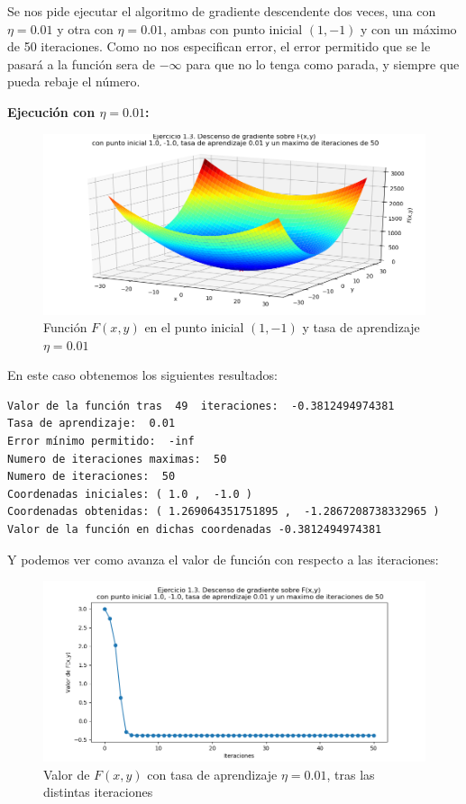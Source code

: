 \documentclass[12pt, spanish]{article}
\begin{document}
Se nos pide ejecutar el algoritmo de gradiente descendente dos veces, una con $\eta = 0.01 $ y otra con $\eta = 0.01 $, ambas con punto inicial $(1, -1)$ y con un máximo de 50 iteraciones. Como no nos especifican error, el error permitido que se le pasará a la función sera de $-\infty$ para que no lo tenga como parada, y siempre que pueda rebaje el número.

\textbf{Ejecución con $\eta = 0.01$:}

\begin{figure}[H]
  \centering
      \includegraphics[scale = 0.70]{ej1-3-1-1-01.png}
 		 \caption{Función $F(x,y)$ en el punto inicial $(1,-1)$ y tasa de aprendizaje $\eta = 0.01$}
  		\label{fig:ej1-3-1-1-01}

\end{figure}

En este caso obtenemos los siguientes resultados:
\begin{lstlisting}
Valor de la función tras  49  iteraciones:  -0.3812494974381
Tasa de aprendizaje:  0.01
Error mínimo permitido:  -inf
Numero de iteraciones maximas:  50
Numero de iteraciones:  50
Coordenadas iniciales: ( 1.0 ,  -1.0 )
Coordenadas obtenidas: ( 1.269064351751895 ,  -1.2867208738332965 )
Valor de la función en dichas coordenadas -0.3812494974381
\end{lstlisting}

\newpage

Y podemos ver como avanza el valor de función con respecto a las iteraciones:

\begin{figure}[H]
  \centering
      \includegraphics[scale = 0.70]{ej1-3-1-1-01-ite.png}
 		 \caption{Valor de $F(x,y)$ con tasa de aprendizaje $\eta = 0.01$, tras las distintas iteraciones}
  		\label{fig:ej1-3-1-1-01}

\end{figure}
\end{document}
